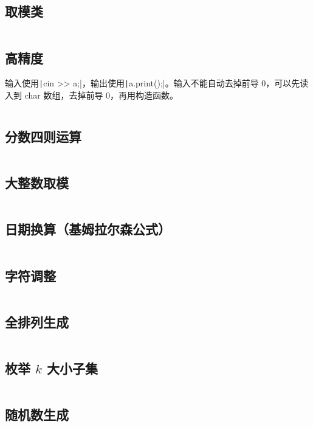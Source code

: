 \documentclass[a4paper, twoside]{article}
\begin{document}
\subsection{取模类}
\inputminted{cpp}{../src/杂项/取模类.cpp}

\subsection{高精度}
输入使用\texttt|cin >> a;|，输出使用\texttt|a.print();|。输入不能自动去掉前导 0，可以先读入到 char 数组，去掉前导 0，再用构造函数。
\inputminted{cpp}{../src/杂项/高精度.cpp}

\subsection{分数四则运算}
\inputminted{cpp}{../src/杂项/分数四则运算.cpp}

\subsection{大整数取模}
\inputminted{cpp}{../src/杂项/大整数取模.cpp}

\subsection{日期换算（基姆拉尔森公式）}
\inputminted{cpp}{../src/杂项/日期换算（基姆拉尔森公式）.cpp}

\subsection{字符调整}
\inputminted{cpp}{../src/杂项/字符调整.cpp}

\subsection{全排列生成}
\inputminted{cpp}{../src/杂项/全排列生成.cpp}

\subsection{枚举 $k$ 大小子集}
\inputminted{cpp}{../src/杂项/枚举k大小子集.cpp}

\subsection{随机数生成}
\inputminted{cpp}{../src/杂项/随机数生成.cpp}
\end{document}

